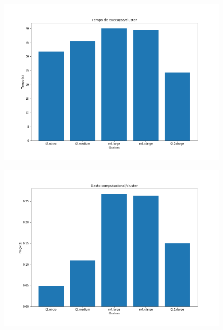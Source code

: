 \documentclass{beamer}
\begin{document}
\begin{frame}
	\begin{figure}[ht]
		\begin{center}
 	 	  \includegraphics[scale=0.4]{figuras/AllNodesTime.png}	
		  \label{fig:fluxogramaAG}		
		\end{center}
	\end{figure}
\end{frame}


\begin{frame}
	\begin{figure}[ht]
		\begin{center}
 	 	  \includegraphics[scale=0.4]{figuras/AllNodesPreco.png}	
		  \label{fig:fluxogramaAG}		
		\end{center}
	\end{figure}
\end{frame}
\end{document}
